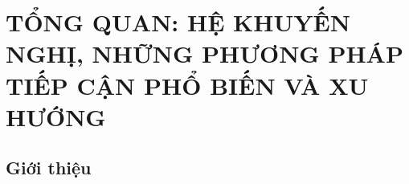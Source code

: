 \chapter{TỔNG QUAN: HỆ KHUYẾN NGHỊ, NHỮNG PHƯƠNG PHÁP TIẾP CẬN PHỔ BIẾN VÀ XU HƯỚNG}
\ifpdf
    \graphicspath{{Chapter1/Chapter1Figs/PNG/}{Chapter1/Chapter1Figs/PDF/}{Chapter1/Chapter1Figs/}}
\else
    \graphicspath{{Chapter1/Chapter1Figs/EPS/}{Chapter1/Chapter1Figs/}}
\fi

\section{Giới thiệu}
%

